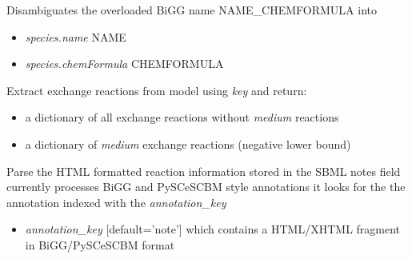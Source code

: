 \documentclass[a4paper,11pt,english]{sphinxmanual}
\begin{document}

\begin{fulllineitems}
\label{modules_doc:cbmpy.CBTools.processBiGGchemFormula}
Disambiguates the overloaded BiGG name NAME\_CHEMFORMULA into
\begin{itemize}
\item {} 
\emph{species.name} NAME

\item {} 
\emph{species.chemFormula} CHEMFORMULA

\end{itemize}

\end{fulllineitems}


\begin{fulllineitems}
\label{modules_doc:cbmpy.CBTools.processExchangeReactions}
Extract exchange reactions from model using \emph{key} and return:
\begin{itemize}
\item {} 
a dictionary of all exchange reactions without \emph{medium} reactions

\item {} 
a dictionary of \emph{medium} exchange reactions (negative lower bound)

\end{itemize}

\end{fulllineitems}


\begin{fulllineitems}
\label{modules_doc:cbmpy.CBTools.processSBMLAnnotationNotes}
Parse the HTML formatted reaction information stored in the SBML notes field currently
processes BiGG and PySCeSCBM style annotations it looks for the the annotation indexed
with the \emph{annotation\_key}
\begin{itemize}
\item {} 
\emph{annotation\_key} {[}default='note'{]} which contains a HTML/XHTML fragment in BiGG/PySCeSCBM format

\end{itemize}

\end{fulllineitems}
\end{document}
